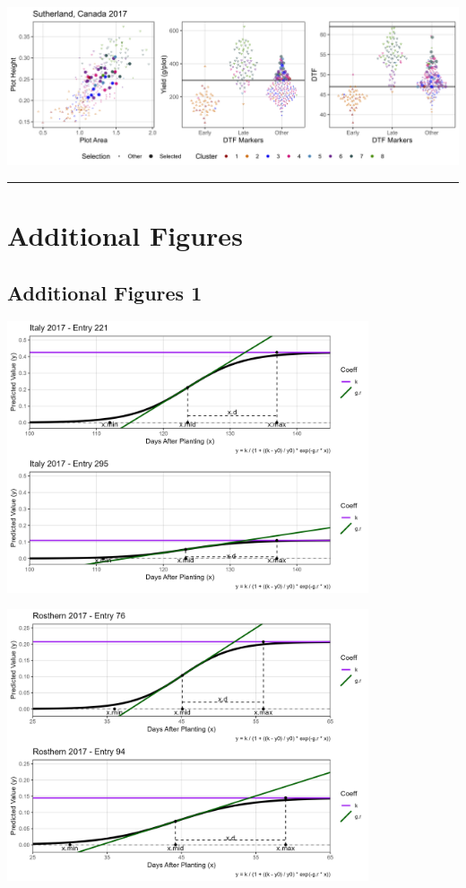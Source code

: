 \documentclass[
]{article}
\begin{document}
\includegraphics{Additional/Supplemental_Figure_06_It17.png}

\begin{center}\rule{0.5\linewidth}{0.5pt}\end{center}

\section{Additional Figures}\label{additional-figures}

\subsection{Additional Figures 1}\label{additional-figures-1}

\includegraphics[width=0.8\textwidth,height=\textheight]{Additional/Additional_Figure_01_1.png}

\includegraphics[width=0.8\textwidth,height=\textheight]{Additional/Additional_Figure_01_2.png}
\end{document}
